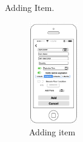 Adding Item.
\begin{figure}[h!]
                	\centering
                   	\includegraphics[width=0.19\textwidth]{images/adding}
                    \caption{Adding item}
                \end{figure}
                

